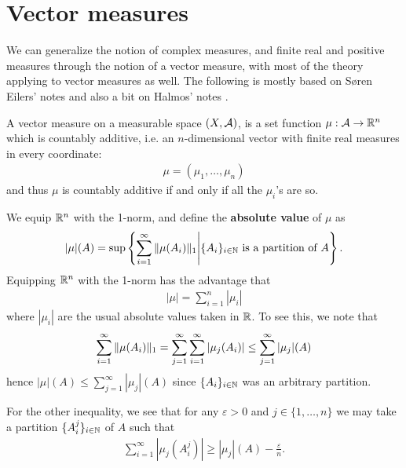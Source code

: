 \section{Vector measures}

We can generalize the notion of complex measures, and finite real and positive measures through the notion of a vector measure, with most of the theory applying to vector measures as well. The following is mostly based on Søren Eilers' notes \cite{BergEilers} %
and also a bit on Halmos' notes \cite{Halmos}.



\begin{definition} %
A vector measure on a measurable space $(X, \mathcal{A})$, is a set function $\mu:\mathcal{A} \to \mathbb{R}^{n}$ which is countably additive, i.e. an $n$-dimensional vector with finite real measures in every coordinate:
\begin{align*}
	\mu=(\mu_{1}, \dots, \mu_{n})
\end{align*}
and thus $\mu$ is countably additive if and only if all the $\mu_{i}$'s are so.
\end{definition}



We equip $\mathbb{R}^{n}$ with the 1-norm, and define the \textbf{absolute value} of $\mu$ as
\begin{align*}
	| \mu | (A) = \sup \left\{ \sum_{i=1}^{\infty} \Vert{\mu(A_{i})}\Vert_{1} \middle| \{ A_{i} \}_{i\in \mathbb{N}} \text{ is a partition of } A \right\}.
\end{align*}
Equipping $\mathbb{R}^{n}$ with the 1-norm has the advantage that
\begin{align}
	|\mu | = \sum_{i=1}^{n} |\mu_{i}| \label{eq: one norm}
\end{align}
where $|\mu_{i}|$ are the usual absolute values taken in $\mathbb{R}$. To see this, we note that
\begin{align*}
	\sum_{i=1}^{\infty} \Vert{\mu(A_{i})}\Vert_{1} = \sum_{j=1}^{\infty} \sum_{i=1}^{\infty} | \mu_{j}(A_{i}) | \le \sum_{j=1}^{\infty} |\mu_{j}|(A)
\end{align*}
hence $|\mu|(A) \le \sum_{j=1}^{\infty} |\mu_{j}|(A)$ since $\{A_{i}\}_{i\in \mathbb{N}}$ was an arbitrary partition.

For the other inequality, we see that for any $\varepsilon>0$ and $j\in \{1, \dots, n\}$ we may take a partition $\{A_{i}^{j}\}_{i\in \mathbb{N}}$ of $A$ such that
\begin{align*}
	\sum_{i=1}^{\infty} | \mu_{j}(A_{i}^{j}) | \ge | \mu_{j}| (A) - \frac{\varepsilon}{n}.
\end{align*}

